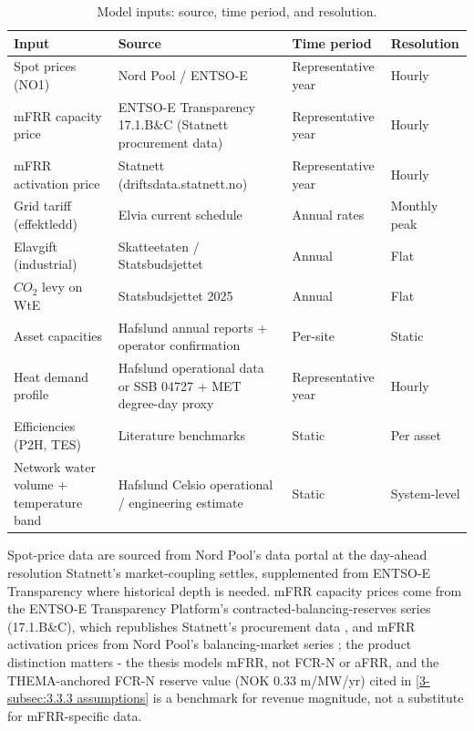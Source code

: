 
\begin{table}[h]
\centering
\caption{Model inputs: source, time period, and resolution.}
\small
\begin{tabular}{p{3.5cm} p{4.5cm} p{2.5cm} p{2cm}}
\toprule
\textbf{Input} & \textbf{Source} & \textbf{Time period} & \textbf{Resolution} \\
\midrule
Spot prices (NO1) & Nord Pool / ENTSO-E & Representative year & Hourly \\
mFRR capacity price & ENTSO-E Transparency 17.1.B\&C (Statnett procurement data) & Representative year & Hourly \\
mFRR activation price & Statnett (driftsdata.statnett.no) & Representative year & Hourly \\
Grid tariff (effektledd) & Elvia current schedule & Annual rates & Monthly peak \\
Elavgift (industrial) & Skatteetaten / Statsbudsjettet & Annual & Flat \\
$CO_2$ levy on WtE & Statsbudsjettet 2025 & Annual & Flat \\
Asset capacities & Hafslund annual reports + operator confirmation & Per-site & Static \\
Heat demand profile & Hafslund operational data or SSB 04727 + MET degree-day proxy & Representative year & Hourly \\
Efficiencies (P2H, TES) & Literature benchmarks & Static & Per asset \\
Network water volume + temperature band & Hafslund Celsio operational / engineering estimate & Static & System-level \\
\bottomrule
\end{tabular}
\label{tab:3.3.2 model input}
\end{table}

Spot-price data are sourced from Nord Pool's data portal at the day-ahead resolution Statnett's market-coupling settles, supplemented from ENTSO-E Transparency where historical depth is needed. mFRR capacity prices come from the ENTSO-E Transparency Platform's contracted-balancing-reserves series (17.1.B\&C), which republishes Statnett's procurement data \cite{entsoe_entsoe_nodate}, and mFRR activation prices from Nord Pool's balancing-market series \cite{nord_pool_nord_nodate}; the product distinction matters - the thesis models mFRR, not FCR-N or aFRR, and the THEMA-anchored FCR-N reserve value (NOK 0.33 m/MW/yr) cited in \autoref{3-subsec:3.3.3 assumptions} is a benchmark for revenue magnitude, not a substitute for mFRR-specific data.

